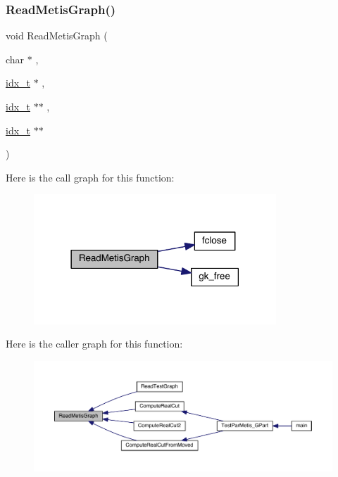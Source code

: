 \subsubsection{\texorpdfstring{Read\+Metis\+Graph()}{ReadMetisGraph()}}
{\footnotesize\ttfamily void Read\+Metis\+Graph (\begin{DoxyParamCaption}\item[{char $\ast$}]{,  }\item[{\hyperlink{a00876_aaa5262be3e700770163401acb0150f52}{idx\+\_\+t} $\ast$}]{,  }\item[{\hyperlink{a00876_aaa5262be3e700770163401acb0150f52}{idx\+\_\+t} $\ast$$\ast$}]{,  }\item[{\hyperlink{a00876_aaa5262be3e700770163401acb0150f52}{idx\+\_\+t} $\ast$$\ast$}]{ }\end{DoxyParamCaption})}

Here is the call graph for this function\+:\nopagebreak
\begin{figure}[H]
\begin{center}
\leavevmode
\includegraphics[width=258pt]{a00954_a779688e907e334b05cb76755bce1ae74_cgraph}
\end{center}
\end{figure}
Here is the caller graph for this function\+:\nopagebreak
\begin{figure}[H]
\begin{center}
\leavevmode
\includegraphics[width=350pt]{a00954_a779688e907e334b05cb76755bce1ae74_icgraph}
\end{center}
\end{figure}
\mbox{\label{a00954_a612a9ac7e28ee021871b62eec92bed0b}} 
